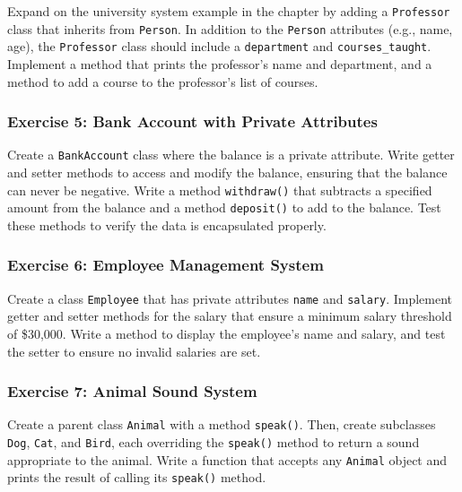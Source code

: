 \documentclass[
  letterpaper,
  DIV=11,
  numbers=noendperiod]{scrreprt}
\begin{document}
Expand on the university system example in the chapter by adding a
\texttt{Professor} class that inherits from \texttt{Person}. In addition
to the \texttt{Person} attributes (e.g., name, age), the
\texttt{Professor} class should include a \texttt{department} and
\texttt{courses\_taught}. Implement a method that prints the professor's
name and department, and a method to add a course to the professor's
list of courses.

\hypertarget{exercise-5-bank-account-with-private-attributes}{%
\subsubsection{Exercise 5: Bank Account with Private
Attributes}\label{exercise-5-bank-account-with-private-attributes}}

Create a \texttt{BankAccount} class where the balance is a private
attribute. Write getter and setter methods to access and modify the
balance, ensuring that the balance can never be negative. Write a method
\texttt{withdraw()} that subtracts a specified amount from the balance
and a method \texttt{deposit()} to add to the balance. Test these
methods to verify the data is encapsulated properly.

\hypertarget{exercise-6-employee-management-system}{%
\subsubsection{Exercise 6: Employee Management
System}\label{exercise-6-employee-management-system}}

Create a class \texttt{Employee} that has private attributes
\texttt{name} and \texttt{salary}. Implement getter and setter methods
for the salary that ensure a minimum salary threshold of \$30,000. Write
a method to display the employee's name and salary, and test the setter
to ensure no invalid salaries are set.

\hypertarget{exercise-7-animal-sound-system}{%
\subsubsection{Exercise 7: Animal Sound
System}\label{exercise-7-animal-sound-system}}

Create a parent class \texttt{Animal} with a method \texttt{speak()}.
Then, create subclasses \texttt{Dog}, \texttt{Cat}, and \texttt{Bird},
each overriding the \texttt{speak()} method to return a sound
appropriate to the animal. Write a function that accepts any
\texttt{Animal} object and prints the result of calling its
\texttt{speak()} method.
\end{document}
